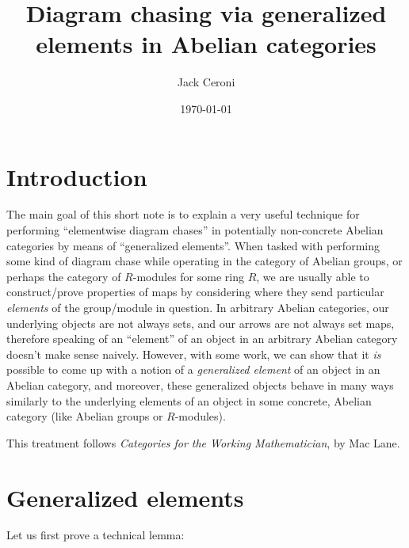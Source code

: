 \documentclass[aps,pra,showpacs,notitlepage,onecolumn,superscriptaddress,nofootinbib]{revtex4-1}
\theoremstyle{definition}
\begin{document}
\title{Diagram chasing via generalized elements in Abelian categories}
\author{Jack Ceroni}
\date{\today}
\maketitle

\section{Introduction}

\noindent The main goal of this short note is to explain a very useful technique for performing ``elementwise diagram chases'' in potentially non-concrete Abelian categories by means
of ``generalized elements''. When tasked with performing some kind of diagram chase while operating in the category of Abelian groups, or perhaps the category of $R$-modules for some
ring $R$, we are usually able to construct/prove properties of maps by considering where they send particular \emph{elements} of the group/module in question. In arbitrary Abelian categories,
our underlying objects are not always sets, and our arrows are not always set maps, therefore speaking of an ``element'' of an object in an arbitrary Abelian category doesn't make sense naively.
However, with some work, we can show that it \emph{is} possible to come up with a notion of a \emph{generalized element} of an object in an Abelian category, and moreover, these generalized objects
behave in many ways similarly to the underlying elements of an object in some concrete, Abelian category (like Abelian groups or $R$-modules).

This treatment follows \emph{Categories for the Working Mathematician}, by Mac Lane.

\section{Generalized elements}

\noindent Let us first prove a technical lemma:
\end{document}
